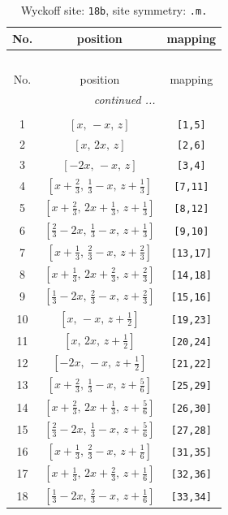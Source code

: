 \documentclass[fleqn,8pt]{jsarticle}
\begin{document}
\begin{longtable}{ccc}
\caption{Wyckoff site: {\tt 18b}, site symmetry: {\tt .m.}}
 \\
 \hline \hline
No. & position & mapping \\ \hline \endfirsthead

\multicolumn{2}{l}{\tablename\ \thetable{}} \\
 \hline \hline
No. & position & mapping \\ \hline \endhead

 \hline \hline
\multicolumn{2}{r}{\footnotesize\it continued ...} \\ \endfoot

 \hline \hline
\multicolumn{2}{r}{} \\ \endlastfoot

1 & $\left[ x,\, - x,\, z \right]$ & {\tt [1,5]} \\ \hline
2 & $\left[ x,\, 2 x,\, z \right]$ & {\tt [2,6]} \\ \hline
3 & $\left[ - 2 x,\, - x,\, z \right]$ & {\tt [3,4]} \\ \hline
4 & $\left[ x + \frac{2}{3},\, \frac{1}{3} - x,\, z + \frac{1}{3} \right]$ & {\tt [7,11]} \\ \hline
5 & $\left[ x + \frac{2}{3},\, 2 x + \frac{1}{3},\, z + \frac{1}{3} \right]$ & {\tt [8,12]} \\ \hline
6 & $\left[ \frac{2}{3} - 2 x,\, \frac{1}{3} - x,\, z + \frac{1}{3} \right]$ & {\tt [9,10]} \\ \hline
7 & $\left[ x + \frac{1}{3},\, \frac{2}{3} - x,\, z + \frac{2}{3} \right]$ & {\tt [13,17]} \\ \hline
8 & $\left[ x + \frac{1}{3},\, 2 x + \frac{2}{3},\, z + \frac{2}{3} \right]$ & {\tt [14,18]} \\ \hline
9 & $\left[ \frac{1}{3} - 2 x,\, \frac{2}{3} - x,\, z + \frac{2}{3} \right]$ & {\tt [15,16]} \\ \hline
10 & $\left[ x,\, - x,\, z + \frac{1}{2} \right]$ & {\tt [19,23]} \\ \hline
11 & $\left[ x,\, 2 x,\, z + \frac{1}{2} \right]$ & {\tt [20,24]} \\ \hline
12 & $\left[ - 2 x,\, - x,\, z + \frac{1}{2} \right]$ & {\tt [21,22]} \\ \hline
13 & $\left[ x + \frac{2}{3},\, \frac{1}{3} - x,\, z + \frac{5}{6} \right]$ & {\tt [25,29]} \\ \hline
14 & $\left[ x + \frac{2}{3},\, 2 x + \frac{1}{3},\, z + \frac{5}{6} \right]$ & {\tt [26,30]} \\ \hline
15 & $\left[ \frac{2}{3} - 2 x,\, \frac{1}{3} - x,\, z + \frac{5}{6} \right]$ & {\tt [27,28]} \\ \hline
16 & $\left[ x + \frac{1}{3},\, \frac{2}{3} - x,\, z + \frac{1}{6} \right]$ & {\tt [31,35]} \\ \hline
17 & $\left[ x + \frac{1}{3},\, 2 x + \frac{2}{3},\, z + \frac{1}{6} \right]$ & {\tt [32,36]} \\ \hline
18 & $\left[ \frac{1}{3} - 2 x,\, \frac{2}{3} - x,\, z + \frac{1}{6} \right]$ & {\tt [33,34]} \\
\end{longtable}
\end{document}
